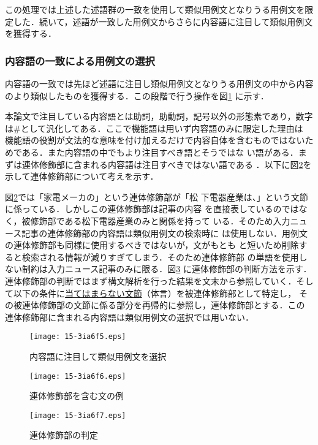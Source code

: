 \documentclass[japanese]{jnlp_1.4}
\begin{document}
この処理では上述した述語群の一致を使用して類似用例文となりうる用例文を限
定した．続いて，述語が一致した用例文からさらに内容語に注目して類似用例文
を獲得する．


\subsubsection{内容語の一致による用例文の選択}\label{節:内容語の一致}

内容語の一致では先ほど述語に注目し類似用例文となりうる用例文の中から内容
のより類似したものを獲得する．この段階で行う操作を図\ref{図:類似用例2} 
に示す．

本論文で注目している内容語とは助詞，助動詞，記号以外の形態素であり，数字
は$\#$として汎化してある．ここで機能語は用いず内容語のみに限定した理由は
機能語の役割が文法的な意味を付け加えるだけで内容自体を含むものではないた
めである．また内容語の中でもより注目すべき語とそうではな
い語がある．まずは連体修飾部に含まれる内容語は注目すべきではない語である
．以下に図\ref{図:連体修飾}を示して連体修飾部について考えを示す．

図\ref{図:連体修飾}では「家電メーカの」という連体修飾部が「松
下電器産業は、」という文節に係っている．しかしこの連体修飾部は記事の内容
を直接表しているのではなく，被修飾部である松下電器産業のみと関係を持って
いる．そのため入力ニュース記事の連体修飾部の内容語は類似用例文の検索時に
は使用しない．用例文の連体修飾部も同様に使用するべきではないが，文がもとも
と短いため削除すると検索される情報が減りすぎてしまう．そのため連体修飾部
の単語を使用しない制約は入力ニュース記事のみに限る．図\ref{図:連体修飾2}
に連体修飾部の判断方法を示す．
連体修飾部の判断ではまず構文解析を行った結果を文末から参照していく．そし
て以下の条件に\ul{当てはまらない文節}（体言）を被連体修飾部として特定し，
その被連体修飾部の文節に係る部分を再帰的に参照し，連体修飾部とする．この
連体修飾部に含まれる内容語は類似用例文の選択では用いない．

\begin{figure}[t]
\begin{center}
\texttt{[image: 15-3ia6f5.eps]}
 \caption{内容語に注目して類似用例文を選択} \label{図:類似用例2}
 \end{center}
\end{figure}
\begin{figure}[t]
\begin{center}
\texttt{[image: 15-3ia6f6.eps]}
 \caption{連体修飾部を含む文の例} \label{図:連体修飾}
 \end{center}
\end{figure}
\begin{figure}[t]
\begin{center}
\texttt{[image: 15-3ia6f7.eps]}
 \caption{連体修飾部の判定} \label{図:連体修飾2}
 \end{center}
\end{figure}
\end{document}
